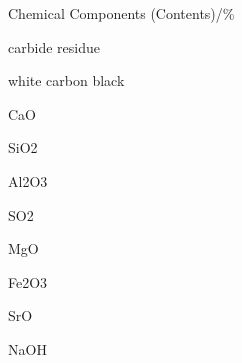 \documentclass[a4paper,portrait,12pt]{article}
\begin{document}
\begin{flushleft}
Chemical Components (Contents)/\%
\end{flushleft}





\begin{flushleft}
carbide residue
\end{flushleft}


\begin{flushleft}
white carbon black
\end{flushleft}





\begin{flushleft}
CaO
\end{flushleft}





\begin{flushleft}
SiO2
\end{flushleft}





\begin{flushleft}
Al2O3
\end{flushleft}





\begin{flushleft}
SO2
\end{flushleft}





\begin{flushleft}
MgO
\end{flushleft}





\begin{flushleft}
Fe2O3
\end{flushleft}





\begin{flushleft}
SrO
\end{flushleft}





\begin{flushleft}
NaOH
\end{flushleft}
\end{document}
